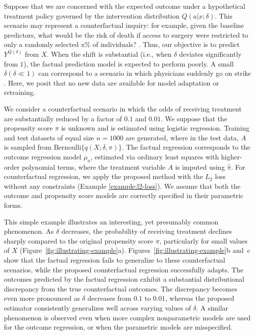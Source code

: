 Suppose that we are concerned with the expected outcome under a hypothetical treatment policy governed by the intervention distribution $Q(a | x;\delta)$. This scenario may represent a counterfactual inquiry: for example, given the baseline predictors, what would be the risk of death if access to surgery were restricted to only a randomly selected x\% of individuals? \citep{dickerman2020counterfactual}.
Thus, our objective is to predict $Y^{Q(\delta)}$ from $X$. When the shift is substantial (i.e., when $\delta$ deviates significantly from $1$), the factual prediction model is expected to perform poorly. A small $\delta (\delta \ll 1)$ can correspond to a scenario in which physicians suddenly go on strike \citep[e.g.,][]{park2024junior}. Here, we posit that no new data are available for model adaptation or retraining.

We consider a counterfactual scenario in which the odds of receiving treatment are substantially reduced by a factor of $0.1$ and $0.01$. We suppose that the propensity score $\pi$ is unknown and is estimated using logistic regression. Training and test datasets of equal size $n = 1000$ are generated, where in the test data, $A$ is sampled from $\text{Bernoulli} \{ q(X; \delta, \pi) \}$. The factual regression corresponds to the outcome regression model $\mu_a$, estimated via ordinary least squares with higher-order polynomial terms, where the treatment variable $A$ is imputed using $\widehat{\pi}$. For counterfactual regression, we apply the proposed method with the $L_2$ loss without any constraints (Example \ref{example:l2-loss}). We assume that both the outcome and propensity score models are correctly specified in their parametric forms.

This simple example illustrates an interesting, yet presumably common phenomenon. As $\delta$ decreases, the probability of receiving treatment declines sharply compared to the original propensity score $\pi$, particularly for small values of $X$ (Figure~\ref{fig:illustrating-example}a). Figures~\ref{fig:illustrating-example}b and~c show that the factual regression fails to generalize to these counterfactual scenarios, while the proposed counterfactual regression successfully adapts. The outcomes predicted by the factual regression exhibit a substantial distributional discrepancy from the true counterfactual outcomes. The discrepancy becomes even more pronounced as $\delta$ decreases from $0.1$ to $0.01$, whereas the proposed estimator consistently generalizes well across varying values of $\delta$. A similar phenomenon is observed even when more complex nonparametric models are used for the outcome regression, or when the parametric models are misspecified.



